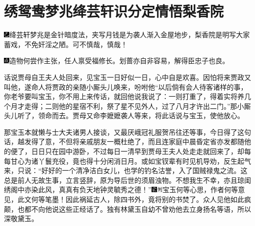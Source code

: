 

\chapter{绣鸳鸯梦兆绛芸轩\hspace{.5em}识分定情悟梨香院}

{\includegraphics[width=3mm]{../Images/00003}绛芸轩梦兆是金针暗度法，夹写月钱是为袭人渐入金屋地步，梨香院是明写大家蓄戏，不免奸淫之陋。可不慎哉，慎哉！}

{\includegraphics[width=3mm]{../Images/00005}造物何尝作主张，任人禀受福修长。划蔷亦自非容易，解得臣忠子也良。}

话说贾母自王夫人处回来，见宝玉一日好似一日，心中自是欢喜。因怕将来贾政又叫他，遂命人将贾政的亲随小厮头儿唤来，吩咐他``以后倘有会人待客诸样的事，你老爷要叫宝玉，你不用上来传话，就回他说我说了：一则打重了，得着实将养几个月才走得；二则他的星宿不利，祭了星不见外人，过了八月才许出二门。''那小厮头儿听了，领命而去。贾母又命李嬷嬷袭人等来，将此话说与宝玉，使他放心。

那宝玉本就懒与士大夫诸男人接谈，又最厌峨冠礼服贺吊往还等事，今日得了这句话，越发得了意，不但将亲戚朋友一概杜绝了，而且连家庭中晨昏定省亦发都随他的便了，日日只在园中游卧，不过每日一清早到贾母王夫人处走走就回来了，却每每甘心为诸丫鬟充役，竟也得十分闲消日月。或如宝钗辈有时见机导劝，反生起气来，只说：``好好的一个清净洁白女儿，也学的钓名沽誉，入了国贼禄鬼之流。这总是前人无故生事，立言竖辞，原为导后世的须眉浊物。不想我生不幸，亦且琼闺绣阁中亦染此风，真真有负天地钟灵毓秀之德！''{\includegraphics[width=3mm]{../Images/00006}\includegraphics[width=3mm]{../Images/00011}\footnotesize \kaishu 宝玉何等心思，作者何等意见，此文何等笔墨！}因此祸延古人，除四书外，竟将别的书焚了。众人见他如此疯颠，也都不向他说这些正经话了。独有林黛玉自幼不曾劝他去立身扬名等语，所以深敬黛玉。

